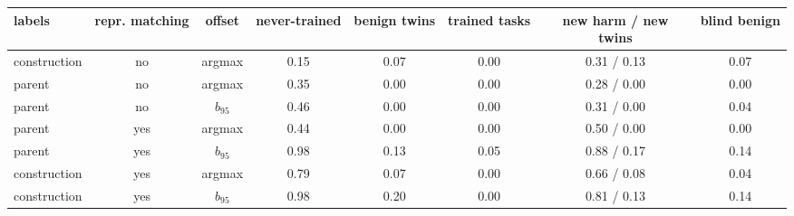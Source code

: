 \begin{tabular}{@{}lccccccc@{}}
\toprule
labels & repr. matching & offset & never-trained & benign twins & trained tasks & new harm / new twins & blind benign \\
\midrule
construction & no & argmax & 0.15 & 0.07 & 0.00 & 0.31 / 0.13 & 0.07 \\
parent & no & argmax & 0.35 & 0.00 & 0.00 & 0.28 / 0.00 & 0.00 \\
parent & no & $b_{95}$ & 0.46 & 0.00 & 0.00 & 0.31 / 0.00 & 0.04 \\
\addlinespace[2pt]
parent & yes & argmax & 0.44 & 0.00 & 0.00 & 0.50 / 0.00 & 0.00 \\
parent & yes & $b_{95}$ & 0.98 & 0.13 & 0.05 & 0.88 / 0.17 & 0.14 \\
construction & yes & argmax & 0.79 & 0.07 & 0.00 & 0.66 / 0.08 & 0.04 \\
construction & yes & $b_{95}$ & 0.98 & 0.20 & 0.00 & 0.81 / 0.13 & 0.14 \\
\bottomrule
\end{tabular}
